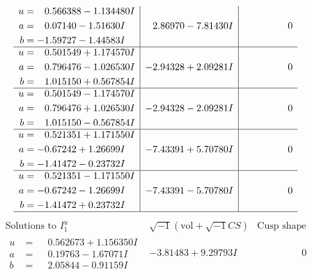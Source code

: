 \documentclass[1p]{elsarticle_modified}
\theoremstyle{definition}
\newcommand{\I}{\sqrt{-1}}
\begin{document}
$$\begin{array}{c|c|c}
\begin{aligned}
u &= \phantom{-}0.566388 - 1.134480 I \\
a &= \phantom{-}0.07140 - 1.51630 I \\
b &= -1.59727 - 1.44583 I\end{aligned}
 & \phantom{-}2.86970 - 7.81430 I & \phantom{-0.000000 } 0 \\ \hline\begin{aligned}
u &= \phantom{-}0.501549 + 1.174570 I \\
a &= \phantom{-}0.796476 - 1.026530 I \\
b &= \phantom{-}1.015150 + 0.567854 I\end{aligned}
 & -2.94328 + 2.09281 I & \phantom{-0.000000 } 0 \\ \hline\begin{aligned}
u &= \phantom{-}0.501549 - 1.174570 I \\
a &= \phantom{-}0.796476 + 1.026530 I \\
b &= \phantom{-}1.015150 - 0.567854 I\end{aligned}
 & -2.94328 - 2.09281 I & \phantom{-0.000000 } 0 \\ \hline\begin{aligned}
u &= \phantom{-}0.521351 + 1.171550 I \\
a &= -0.67242 + 1.26699 I \\
b &= -1.41472 - 0.23732 I\end{aligned}
 & -7.43391 + 5.70780 I & \phantom{-0.000000 } 0 \\ \hline\begin{aligned}
u &= \phantom{-}0.521351 - 1.171550 I \\
a &= -0.67242 - 1.26699 I \\
b &= -1.41472 + 0.23732 I\end{aligned}
 & -7.43391 - 5.70780 I & \phantom{-0.000000 } 0\\
 \hline 
 \end{array}$$\newpage$$\begin{array}{c|c|c}  
\text{Solutions to }I^u_{1}& \I (\text{vol} + \sqrt{-1}CS) & \text{Cusp shape}\\
 \hline 
\begin{aligned}
u &= \phantom{-}0.562673 + 1.156350 I \\
a &= \phantom{-}0.19763 - 1.67071 I \\
b &= \phantom{-}2.05844 - 0.91159 I\end{aligned}
 & -3.81483 + 9.29793 I & \phantom{-0.000000 } 0 \\ \hline\begin{aligned}

\end{aligned}
\end{array}$$
\end{document}

